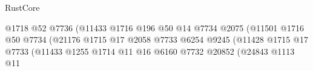 \begin{lexlean}{RustCore}
\begin{coremodule}
                                                              @1718
                                                              @52
                                                              @7736
                                                              (@11433
                                                                @1716
                                                                @196
                                                                @50
                                                                @14
                                                                @7734
                                                                @2075
                                                                (@11501
                                                                  @1716
                                                                  @50
                                                                  @7734
                                                                  (@21176
                                                                    @1715
                                                                    @17
                                                                    @2058
                                                                    @7733
                                                                    @6254
                                                                    @9245
                                                                    (@11428
                                                                      @1715
                                                                      @17
                                                                      @7733
                                                                      (@11433
                                                                        @1255
                                                                        @1714
                                                                        @11
                                                                        @16
                                                                        @6160
                                                                        @7732
                                                                        @20852
                                                                        (@24843
                                                                          @1113
                                                                          @11

\end{coremodule}
\end{lexlean}
